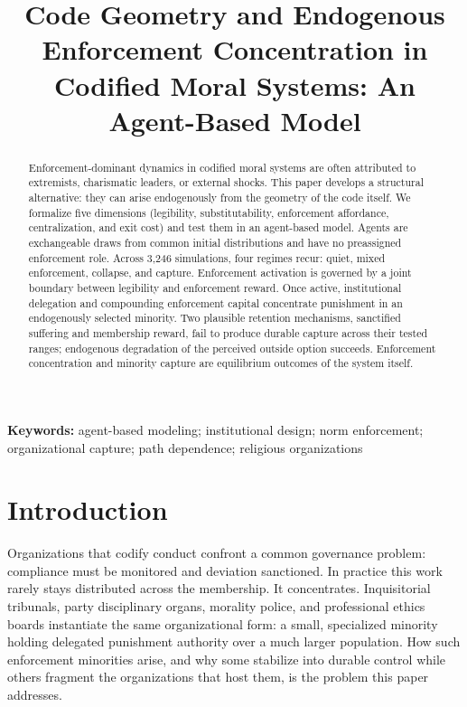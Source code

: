 \documentclass[12pt]{article}
\title{Code Geometry and Endogenous Enforcement Concentration in Codified Moral Systems: An Agent-Based Model}
\author{}
\date{}
\date{}
\newcommand{\affiliation}{}
\begin{document}
\maketitle
\vspace{1em}


\begin{abstract}
Enforcement-dominant dynamics in codified moral systems are often attributed to extremists, charismatic leaders, or external shocks. This paper develops a structural alternative: they can arise endogenously from the geometry of the code itself. We formalize five dimensions (legibility, substitutability, enforcement affordance, centralization, and exit cost) and test them in an agent-based model. Agents are exchangeable draws from common initial distributions and have no preassigned enforcement role. Across 3,246 simulations, four regimes recur: quiet, mixed enforcement, collapse, and capture. Enforcement activation is governed by a joint boundary between legibility and enforcement reward. Once active, institutional delegation and compounding enforcement capital concentrate punishment in an endogenously selected minority. Two plausible retention mechanisms, sanctified suffering and membership reward, fail to produce durable capture across their tested ranges; endogenous degradation of the perceived outside option succeeds. Enforcement concentration and minority capture are equilibrium outcomes of the system itself.
\end{abstract}
\vspace{1em}\noindent\textbf{Keywords:} agent-based modeling; institutional design; norm enforcement; organizational capture; path dependence; religious organizations

\newpage


\section{Introduction}

Organizations that codify conduct confront a common governance problem: compliance must be monitored and deviation sanctioned. In practice this work rarely stays distributed across the membership. It concentrates. Inquisitorial tribunals, party disciplinary organs, morality police, and professional ethics boards instantiate the same organizational form: a small, specialized minority holding delegated punishment authority over a much larger population. How such enforcement minorities arise, and why some stabilize into durable control while others fragment the organizations that host them, is the problem this paper addresses.
\end{document}
